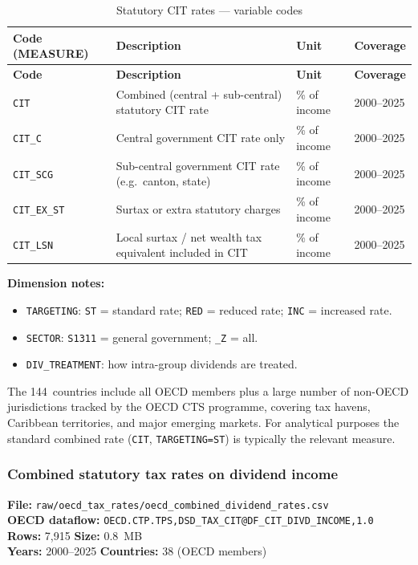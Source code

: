 \documentclass[11pt,a4paper]{article}
\newcommand{\code}[1]{\texttt{#1}}
\begin{document}
\begin{longtable}{@{}L{2.8cm} L{6.0cm} C{1.8cm} C{2.5cm}@{}}
\caption{Statutory CIT rates --- variable codes}\label{tab:cit_rates}\\
\toprule
\textbf{Code (MEASURE)} & \textbf{Description} & \textbf{Unit} & \textbf{Coverage} \\
\midrule
\endfirsthead
\toprule
\textbf{Code} & \textbf{Description} & \textbf{Unit} & \textbf{Coverage} \\
\midrule
\endhead
\bottomrule
\endlastfoot
\code{CIT}       & Combined (central + sub-central) statutory CIT rate & \% of income & 2000--2025 \\
\code{CIT\_C}    & Central government CIT rate only & \% of income & 2000--2025 \\
\code{CIT\_SCG}  & Sub-central government CIT rate (e.g.\ canton, state) & \% of income & 2000--2025 \\
\code{CIT\_EX\_ST} & Surtax or extra statutory charges & \% of income & 2000--2025 \\
\code{CIT\_LSN}  & Local surtax / net wealth tax equivalent included in CIT & \% of income & 2000--2025 \\
\end{longtable}

\noindent\textbf{Dimension notes:}
\begin{itemize}[noitemsep]
    \item \texttt{TARGETING}: \texttt{ST} = standard rate; \texttt{RED} = reduced rate; \texttt{INC} = increased rate.
    \item \texttt{SECTOR}: \texttt{S1311} = general government; \texttt{\_Z} = all.
    \item \texttt{DIV\_TREATMENT}: how intra-group dividends are treated.
\end{itemize}

The 144~countries include all OECD members plus a large number of non-OECD jurisdictions tracked by the OECD CTS programme, covering tax havens, Caribbean territories, and major emerging markets.  For analytical purposes the standard combined rate (\texttt{CIT}, \texttt{TARGETING=ST}) is typically the relevant measure.

\subsubsection{Combined statutory tax rates on dividend income}

\textbf{File:} \texttt{raw/oecd\_tax\_rates/oecd\_combined\_dividend\_rates.csv}\\
\textbf{OECD dataflow:} \texttt{OECD.CTP.TPS,DSD\_TAX\_CIT@DF\_CIT\_DIVD\_INCOME,1.0}\\
\textbf{Rows:} 7{,}915 \quad \textbf{Size:} 0.8~MB\\
\textbf{Years:} 2000--2025 \quad \textbf{Countries:} 38 (OECD members)
\end{document}
